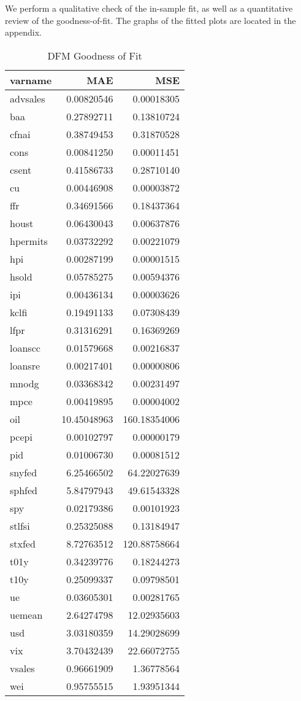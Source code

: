 \documentclass[11pt, letterpaper]{article}\usepackage[]{graphicx}\usepackage[]{color}
\begin{document}
We perform a qualitative check of the in-sample fit, as well as a quantitative review of the goodness-of-fit. The graphs of the fitted plots are located in the appendix.
\begin{table}[H]
\centering
\begingroup\footnotesize
\begin{tabular}{lrr}
  \hline
varname & MAE & MSE \\ 
  \hline
advsales & 0.00820546 & 0.00018305 \\ 
  baa & 0.27892711 & 0.13810724 \\ 
  cfnai & 0.38749453 & 0.31870528 \\ 
  cons & 0.00841250 & 0.00011451 \\ 
  csent & 0.41586733 & 0.28710140 \\ 
  cu & 0.00446908 & 0.00003872 \\ 
  ffr & 0.34691566 & 0.18437364 \\ 
  houst & 0.06430043 & 0.00637876 \\ 
  hpermits & 0.03732292 & 0.00221079 \\ 
  hpi & 0.00287199 & 0.00001515 \\ 
  hsold & 0.05785275 & 0.00594376 \\ 
  ipi & 0.00436134 & 0.00003626 \\ 
  kclfi & 0.19491133 & 0.07308439 \\ 
  lfpr & 0.31316291 & 0.16369269 \\ 
  loanscc & 0.01579668 & 0.00216837 \\ 
  loansre & 0.00217401 & 0.00000806 \\ 
  mnodg & 0.03368342 & 0.00231497 \\ 
  mpce & 0.00419895 & 0.00004002 \\ 
  oil & 10.45048963 & 160.18354006 \\ 
  pcepi & 0.00102797 & 0.00000179 \\ 
  pid & 0.01006730 & 0.00081512 \\ 
  snyfed & 6.25466502 & 64.22027639 \\ 
  sphfed & 5.84797943 & 49.61543328 \\ 
  spy & 0.02179386 & 0.00101923 \\ 
  stlfsi & 0.25325088 & 0.13184947 \\ 
  stxfed & 8.72763512 & 120.88758664 \\ 
  t01y & 0.34239776 & 0.18244273 \\ 
  t10y & 0.25099337 & 0.09798501 \\ 
  ue & 0.03605301 & 0.00281765 \\ 
  uemean & 2.64274798 & 12.02935603 \\ 
  usd & 3.03180359 & 14.29028699 \\ 
  vix & 3.70432439 & 22.66072755 \\ 
  vsales & 0.96661909 & 1.36778564 \\ 
  wei & 0.95755515 & 1.93951344 \\ 
   \hline
\end{tabular}
\endgroup
\caption{DFM Goodness of Fit} 
\end{table}
\end{document}
